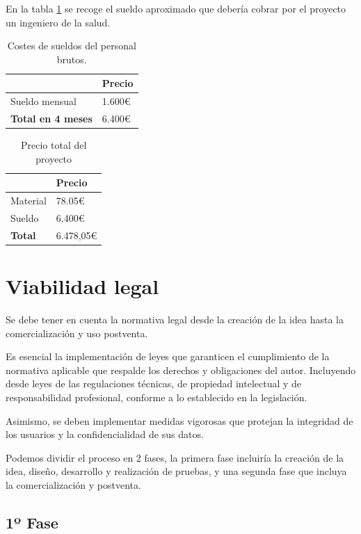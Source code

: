 En la tabla \ref{tab:costes_personal} se recoge el sueldo aproximado que debería cobrar por el proyecto un ingeniero de la salud.

\begin{table}[h]
\centering
\begin{tabular}{|l|l|}
\hline
\rowcolor[HTML]{BFBFBF} 
\textbf{} & \textbf{Precio} \\ \hline
Sueldo mensual & 1.600€ \\ \hline
\textbf{Total en 4 meses }& 6.400€ \\ \hline
\end{tabular}
\caption{Costes de sueldos del personal brutos.}
\label{tab:costes_personal}
\end{table}

\begin{table}[h]
\centering
\begin{tabular}{|l|l|}
\hline
\rowcolor[HTML]{BFBFBF} 
\textbf{} & \textbf{Precio} \\ \hline
Material & 78.05€ \\ \hline
Sueldo  &  6.400€ \\ \hline
\textbf{Total }& 6.478,05€ \\ \hline
\end{tabular}
\caption{Precio total del proyecto}
\label{tab:Costes Totales}
\end{table}

\section{Viabilidad legal}
Se debe tener en cuenta la normativa legal desde la creación de la idea hasta la comercialización y uso postventa.

Es esencial la implementación de leyes que garanticen el cumplimiento de la normativa aplicable que respalde los derechos y obligaciones del autor. Incluyendo desde leyes de las regulaciones técnicas, de propiedad intelectual y de responsabilidad profesional, conforme a lo establecido en la legislación.

Asimismo, se deben implementar medidas vigorosas que protejan la integridad de los usuarios y la confidencialidad de sus datos. 

Podemos dividir el proceso en 2 fases, la primera fase incluiría la creación de la idea, diseño, desarrollo y realización de pruebas, y una segunda fase que incluya la comercialización y postventa.

\subsection{1º Fase}

